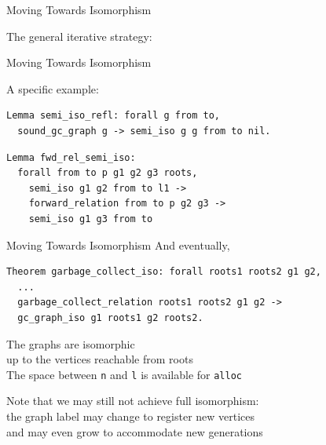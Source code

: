 \documentclass[usenames, xcolor=dvipsnames]{beamer}
\begin{document}
\begin{frame}[fragile]{Moving Towards Isomorphism}

The general iterative strategy:

\bigskip

\begin{center}
\end{center}
\end{frame}

\begin{frame}[fragile]{Moving Towards Isomorphism}

A specific example:
\begin{Verbatim}
Lemma semi_iso_refl: forall g from to,
  sound_gc_graph g -> semi_iso g g from to nil.
\end{Verbatim}
\pause
\begin{Verbatim}
Lemma fwd_rel_semi_iso:
  forall from to p g1 g2 g3 roots,
    semi_iso g1 g2 from to l1 -> 
    forward_relation from to p g2 g3 ->
    semi_iso g1 g3 from to
\end{Verbatim}
\end{frame}

\begin{frame}[fragile]{Moving Towards Isomorphism}
And eventually, 
\begin{Verbatim}
Theorem garbage_collect_iso: forall roots1 roots2 g1 g2,
  ...
  garbage_collect_relation roots1 roots2 g1 g2 ->
  gc_graph_iso g1 roots1 g2 roots2.
\end{Verbatim}

\bigskip \pause

The graphs are isomorphic
\\\hspace{1em}\alert{up to the vertices reachable from roots}\\
\pause The space between \texttt{n} and \texttt{l} is \alert{available for \texttt{alloc}}

\bigskip \pause

Note that we may still not achieve full isomorphism:
\\\pause \hspace{1em}the \alert{graph label} may change to register new vertices
\\\pause \hspace{2em}and may even grow to accommodate new generations
\end{frame}
\end{document}
